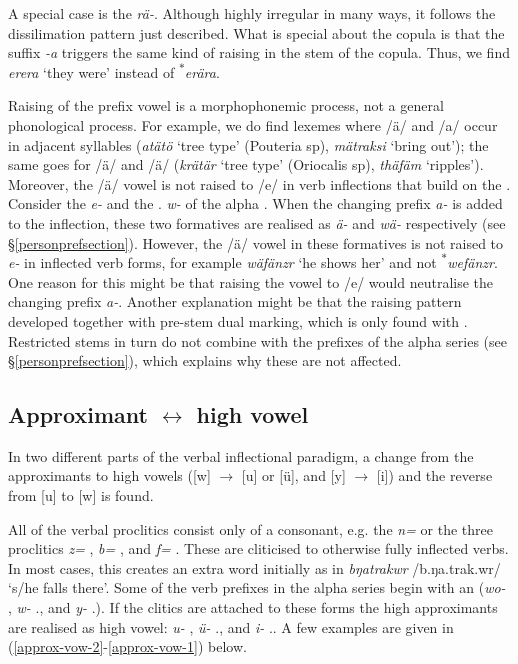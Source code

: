 A special case is the  \emph{rä-}. Although highly irregular in many ways, it follows the dissilimation pattern just described. What is special about the copula is that the  suffix \emph{-a} triggers the same kind of raising in the stem of the copula. Thus, we find \emph{erera} `they were' instead of \textsuperscript{$\ast$}\emph{erära}.%

Raising of the prefix vowel is a morphophonemic process, not a general phonological process. For example, we do find lexemes where /ä/ and /a/ occur in adjacent syllables (\emph{atätö} `tree type' (Pouteria sp), \emph{mätraksi} `bring out'); the same goes for /ä/ and /ä/ (\emph{krätär} `tree type' (Oriocalis sp), \emph{thäfäm} `ripples'). Moreover, the /ä/ vowel is not raised to /e/ in verb inflections that build on the . Consider the \Stnsg{} \emph{e-} and the \Tsg.\F{} \emph{w-} of the alpha . When the  changing prefix \emph{a-} is added to the inflection, these two formatives are realised as \emph{ä-} and \emph{wä-} respectively (see \S{}\ref{personprefsection}). However, the /ä/ vowel in these formatives is not raised to \emph{e-} in inflected verb forms, for example \emph{wäfänzr} `he shows her' and not \textsuperscript{$\ast$}\emph{wefänzr}. One reason for this might be that raising the vowel to /e/ would neutralise the  changing prefix \emph{a-}. Another explanation might be that the raising pattern developed together with pre-stem dual marking, which is only found with . Restricted stems in turn do not combine with the prefixes of the alpha series (see \S{}\ref{personprefsection}), which explains why these are not affected.

\subsection[Approximant  ↔ high vowel]{Approximant $\leftrightarrow$ high vowel} \label{approxhighvowel}

In two different parts of the verbal inflectional paradigm, a change from the approximants to high vowels ([w] $\rightarrow$ [u] or [ü], and [y] $\rightarrow$ [i]) and the reverse from [u] to [w] is found.%

All of the verbal proclitics consist only of a consonant, e.g. the  \emph{n=} or the three  proclitics \emph{z=} \Prox{}, \emph{b=} \Med{}, and \emph{f=} \Dist{}. These are cliticised to otherwise fully inflected verbs. In most cases, this creates an extra  word initially as in \emph{bŋatrakwr} /b.ŋa.trak.wr/ `s/he falls there'. Some of the verb prefixes in the alpha series begin with an  (\emph{wo-} \Fsg{}, \emph{w-} \Tsg.\F{}, and \emph{y-} \Tsg.\Masc{}). If the clitics are attached to these forms the high approximants are realised as high vowel: \emph{u-} \Fsg{}, \emph{ü-} \Tsg.\F{}, and \emph{i-} \Tsg.\Masc{}. A few examples are given in (\ref{approx-vow-2}-\ref{approx-vow-1}) below.


